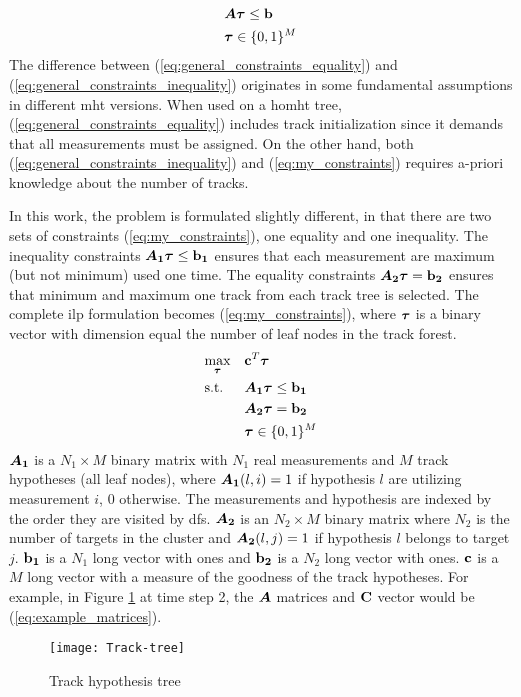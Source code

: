 \begin{equation}
\begin{aligned}
&	\bm{A} \boldsymbol{\mathbf{\tau}} \leq \boldsymbol{\mathbf{b}} 	\\
&	\boldsymbol{\mathbf{\tau}} \in \{0,1\}^M
\end{aligned}
\label{eq:general_constraints_inequality}
\end{equation}
The difference between (\ref{eq:general_constraints_equality}) and (\ref{eq:general_constraints_inequality}) originates in some fundamental assumptions in different \gls{mht} versions. When used on a \gls{homht} tree, (\ref{eq:general_constraints_equality}) includes track initialization since it demands that all measurements must be assigned. On the other hand, both (\ref{eq:general_constraints_inequality}) and (\ref{eq:my_constraints}) requires a-priori knowledge about the number of tracks.

In this work, the problem is formulated slightly different, in that there are two sets of constraints (\ref{eq:my_constraints}), one equality and one inequality. The inequality constraints $\bm{A_1} \boldsymbol{\mathbf{\tau}} \leq \boldsymbol{\mathbf{b_1}}$ ensures that each measurement are maximum (but not minimum) used one time. The equality constraints $\bm{A_2} \boldsymbol{\mathbf{\tau}} = \boldsymbol{\mathbf{b_2}}$ ensures that minimum and maximum one track from each track tree is selected. The complete \gls{ilp} formulation becomes (\ref{eq:my_constraints}), where $\boldsymbol{\mathbf{\tau}}$ is a binary vector with dimension equal the number of leaf nodes in the track forest.
\begin{equation}
\begin{aligned}
&	\underset{\boldsymbol{\mathbf{\tau}}}{\text{max}}
&&	\boldsymbol{\mathbf{c}}^T \boldsymbol{\mathbf{\tau}} \\
&	\text{s.t.}
&&	\bm{A_1} \boldsymbol{\mathbf{\tau}} \leq \boldsymbol{\mathbf{b_1}} 	\\
&&&	\bm{A_2} \boldsymbol{\mathbf{\tau}} = \boldsymbol{\mathbf{b_2}}	\\
&&&	\boldsymbol{\mathbf{\tau}} \in \{0,1\}^M
\end{aligned}
\label{eq:my_constraints}
\end{equation}
$\bm{A_1}$ is a $N_1 \times M$ binary matrix with $N_1$ real measurements and $M$ track hypotheses (all leaf nodes), where $\bm{A_1}(l,i)=1$ if hypothesis $l$ are utilizing measurement $i$, $0$ otherwise. The measurements and hypothesis are indexed by the order they are visited by \gls{dfs}. $\bm{A_2}$ is an $N_2 \times M$ binary matrix where $N_2$ is the number of targets in the cluster and $\bm{A_2}(l,j)=1$ if hypothesis $l$ belongs to target $j$. $\boldsymbol{\mathbf{b_1}}$ is a $N_1$ long vector with ones and $\boldsymbol{\mathbf{b_2}}$ is a $N_2$ long vector with ones. $\boldsymbol{\mathbf{c}}$ is a $M$ long vector with a measure of the goodness of the track hypotheses. For example, in Figure \ref{fig:hyp-tree} at time step 2, the $\bm{A}$ matrices and $\boldsymbol{\mathbf{C}}$ vector would be (\ref{eq:example_matrices}).
\begin{figure}[H]
\centering
\texttt{[image: Track-tree]}
\caption{Track hypothesis tree}
\label{fig:hyp-tree}
\end{figure}

